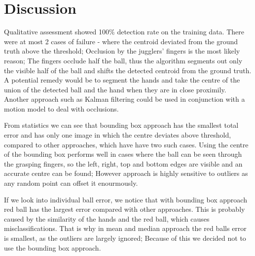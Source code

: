 \documentclass[10pt,a4paper,oneclumn]{article}
\begin{document}
\section{Discussion}
Qualitative assessment showed 100\% detection rate on the training data. There were at most 2 cases of failure - where the centroid deviated from the ground truth above the threshold; Occlusion by the jugglers' fingers is the most likely reason; The fingers occlude half the ball, thus the algorithm segments out only the visible half of the ball and shifts the detected centroid from the ground truth. A potential remedy would be to segment the hands and take the centre of the union of the detected ball and the hand when they are in close proximily. Another approach such as Kalman filtering could be used in conjunction with a motion model to deal with occlusions.

From statistics we can see that bounding box approach has the smallest total error and has only one image in which the centre deviates above threshold, compared to other approaches, which have have two such cases. Using the centre of the bounding box performs well in cases where the ball can be seen through the grasping fingers, so the left, right, top and bottom edges are visible and an accurate centre can be found; However approach is highly sensitive to outliers as any random point can offset it enourmously.

If we look into individual ball error, we notice that with bounding box approach red ball has the largest error compared with other approaches. This is probably caused by the similarity of the hands and the red ball, which causes misclassifications. That is why in mean and median approach the red balls error is smallest, as the outliers are largely ignored; Because of this we decided not to use the bounding box approach.
\end{document}
